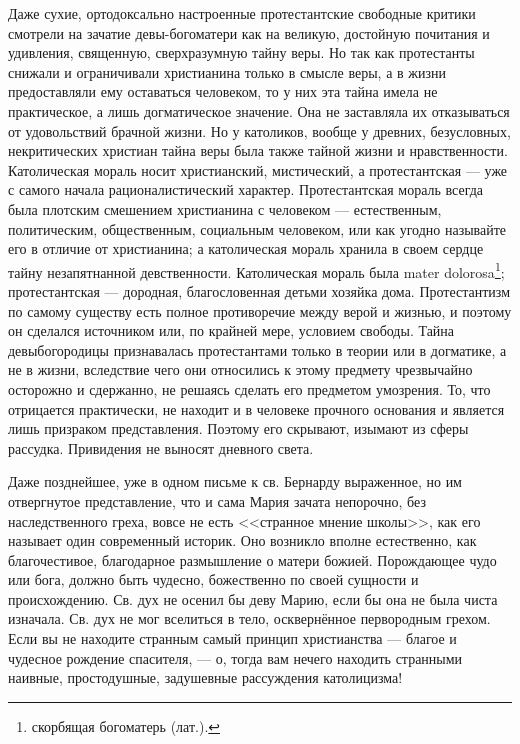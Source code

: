 \documentclass[12pt,oneside]{book}
\begin{document}
Даже сухие, ортодоксально настроенные протестантские свободные критики смотрели на зачатие девы-богоматери как на великую, достойную почитания и удивления, священную, сверхразумную тайну веры\ddag\let\svthefootnote\thefootnote\let\thefootnote\relax{}\let\thefootnote\svthefootnote. Но так как протестанты снижали и ограничивали христианина только в смысле веры, а в жизни предоставляли ему оставаться человеком, то у них эта тайна имела не практическое, а лишь догматическое значение. Она не заставляла их отказываться от удовольствий брачной жизни. Но у католиков, вообще у древних, безусловных, некритических христиан тайна веры была также тайной жизни и нравственности. Католическая мораль носит христианский, мистический, а протестантская --- уже с самого начала рационалистический характер. Протестантская мораль всегда была плотским смешением христианина с человеком --- естественным, политическим, общественным, социальным человеком, или как угодно называйте его в отличие от христианина; а католическая мораль хранила в своем сердце тайну незапятнанной девственности. Католическая мораль была mater dolorosa\footnote{скорбящая богоматерь (лат.).}; протестантская --- дородная, благословенная детьми хозяйка дома. Протестантизм по самому существу есть полное противоречие между верой и жизнью, и поэтому он сделался источником или, по крайней мере, условием свободы. Тайна девыбогородицы признавалась протестантами только в теории или в догматике, а не в жизни, вследствие чего они относились к этому предмету чрезвычайно осторожно и сдержанно, не решаясь сделать его предметом умозрения. То, что отрицается практически, не находит и в человеке прочного основания и является лишь призраком представления. Поэтому его скрывают, изымают из сферы рассудка. Привидения не выносят дневного света.



Даже позднейшее, уже в одном письме к св. Бернарду выраженное, но им отвергнутое представление, что и сама Мария зачата непорочно, без наследственного греха, вовсе не есть <<странное мнение школы>>, как его называет один современный историк. Оно возникло вполне естественно, как благочестивое, благодарное размышление о матери божией. Порождающее чудо или бога, должно быть чудесно, божественно по своей сущности и происхождению. Св. дух не осенил бы деву Марию, если бы она не была чиста изначала. Св. дух не мог вселиться в тело, осквернённое первородным грехом. Если вы не находите странным самый принцип христианства --- благое и чудесное рождение спасителя, --- о, тогда вам нечего находить странными наивные, простодушные, задушевные рассуждения католицизма!
\end{document}
